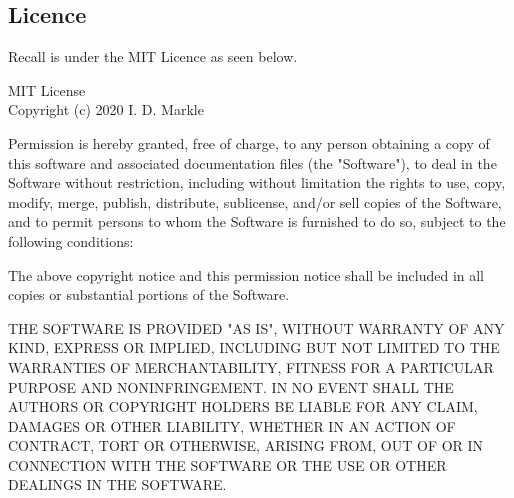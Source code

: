\documentclass[letterpaper]{article}
\begin{document}
\subsection{Licence} \label{licence}
Recall is under the MIT Licence as seen below.\\
\begin{center}
MIT License\\
Copyright (c) 2020 I. D. Markle
\end{center}

Permission is hereby granted, free of charge, to any person obtaining a copy of this software and associated documentation files (the "Software"), to deal in the Software without restriction, including without limitation the rights to use, copy, modify, merge, publish, distribute, sublicense, and/or sell
copies of the Software, and to permit persons to whom the Software is furnished to do so, subject to the following conditions:

The above copyright notice and this permission notice shall be included in all copies or substantial portions of the Software.

THE SOFTWARE IS PROVIDED "AS IS", WITHOUT WARRANTY OF ANY KIND, EXPRESS OR IMPLIED, INCLUDING BUT NOT LIMITED TO THE WARRANTIES OF MERCHANTABILITY, FITNESS FOR A PARTICULAR PURPOSE AND NONINFRINGEMENT. IN NO EVENT SHALL THE AUTHORS OR COPYRIGHT HOLDERS BE LIABLE FOR ANY CLAIM, DAMAGES OR OTHER
LIABILITY, WHETHER IN AN ACTION OF CONTRACT, TORT OR OTHERWISE, ARISING FROM, OUT OF OR IN CONNECTION WITH THE SOFTWARE OR THE USE OR OTHER DEALINGS IN THE SOFTWARE.
\end{document}
